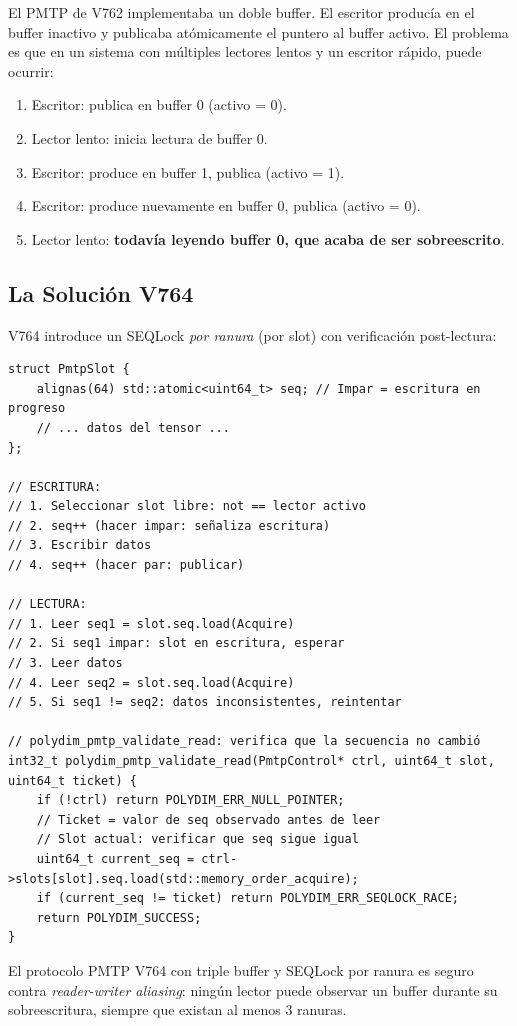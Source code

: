 El PMTP de V762 implementaba un doble buffer. El escritor producía en el buffer
inactivo y publicaba atómicamente el puntero al buffer activo. El problema es que
en un sistema con múltiples lectores lentos y un escritor rápido, puede ocurrir:

\begin{enumerate}
\item Escritor: publica en buffer 0 (activo = 0).
\item Lector lento: inicia lectura de buffer 0.
\item Escritor: produce en buffer 1, publica (activo = 1).
\item Escritor: produce nuevamente en buffer 0, publica (activo = 0).
\item Lector lento: \textbf{todavía leyendo buffer 0, que acaba de ser sobreescrito}.
\end{enumerate}

\subsection{La Solución V764}

V764 introduce un SEQLock \textit{por ranura} (por slot) con verificación post-lectura:

\begin{verbatim}
struct PmtpSlot {
    alignas(64) std::atomic<uint64_t> seq; // Impar = escritura en progreso
    // ... datos del tensor ...
};

// ESCRITURA:
// 1. Seleccionar slot libre: not == lector activo
// 2. seq++ (hacer impar: señaliza escritura)
// 3. Escribir datos
// 4. seq++ (hacer par: publicar)

// LECTURA:
// 1. Leer seq1 = slot.seq.load(Acquire)
// 2. Si seq1 impar: slot en escritura, esperar
// 3. Leer datos
// 4. Leer seq2 = slot.seq.load(Acquire)
// 5. Si seq1 != seq2: datos inconsistentes, reintentar

// polydim_pmtp_validate_read: verifica que la secuencia no cambió
int32_t polydim_pmtp_validate_read(PmtpControl* ctrl, uint64_t slot, uint64_t ticket) {
    if (!ctrl) return POLYDIM_ERR_NULL_POINTER;
    // Ticket = valor de seq observado antes de leer
    // Slot actual: verificar que seq sigue igual
    uint64_t current_seq = ctrl->slots[slot].seq.load(std::memory_order_acquire);
    if (current_seq != ticket) return POLYDIM_ERR_SEQLOCK_RACE;
    return POLYDIM_SUCCESS;
}
\end{verbatim}

\begin{theorem}

El protocolo PMTP V764 con triple buffer y SEQLock por ranura es seguro contra
\textit{reader-writer aliasing}: ningún lector puede observar un buffer durante
su sobreescritura, siempre que existan al menos 3 ranuras.
\end{theorem}

